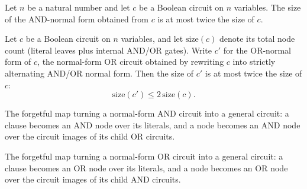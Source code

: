\begin{theorem}
\label{BoolCircuit.toNAnd_size_le}
\leanok
{}
Let $n$ be a natural number and let $c$ be a Boolean circuit on $n$ variables. The size
of the AND-normal form obtained from $c$ is at most twice the size of $c$.
\end{theorem}

\begin{theorem}
\label{BoolCircuit.toNOr_size_le}
\leanok
{}
Let $c$ be a Boolean circuit on $n$ variables, and let $\mathrm{size}(c)$ denote its
total node count (literal leaves plus internal AND/OR gates). Write $c'$ for the
OR-normal form of $c$, the normal-form OR circuit obtained by rewriting $c$ into
strictly alternating AND/OR normal form. Then the size of $c'$ is at most twice the size
of $c$:
\[
\mathrm{size}(c') \le 2\,\mathrm{size}(c).
\]
\end{theorem}

\begin{definition}
\label{BoolCircuit.NAndCircuit.toTreeCircuit}
\leanok
{}
The forgetful map turning a normal-form AND circuit into a general circuit: a clause
becomes an AND node over its literals, and a node becomes an AND node over the
circuit images of its child OR circuits.
\end{definition}

\begin{definition}
\label{BoolCircuit.NOrCircuit.toTreeCircuit}
\leanok
{}
The forgetful map turning a normal-form OR circuit into a general circuit: a clause
becomes an OR node over its literals, and a node becomes an OR node over the circuit
images of its child AND circuits.
\end{definition}

